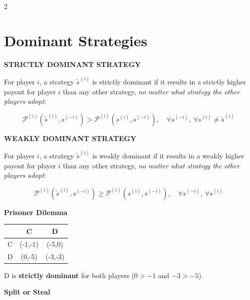 \documentclass[a4paper,9pt]{extarticle}
\begin{document}
\begin{multicols}{2}
\section{Dominant Strategies}


\begin{definition}

\textbf{STRICTLY DOMINANT STRATEGY}

For player $i$, a strategy $\tilde{s}^{(i)}$ is strictly dominant if it results in a
strictly higher payout for player $i$ than any other strategy, \emph{no matter what strategy
the other players adopt}:

\[
\mathcal{P}^{(i)}(\tilde{s}^{(i)}, s^{(-i)}) > \mathcal{P}^{(i)}(s^{(i)}, s^{(-i)}),
\quad \forall s^{(-i)}, \ \forall s^{(i)} \ne \tilde{s}^{(i)}
\]

\end{definition}


\begin{definition}

\textbf{WEAKLY DOMINANT STRATEGY}

For player $i$, a strategy $\tilde{s}^{(i)}$ is weakly dominant if it results in a weakly
higher payout for player $i$ than any other strategy, \emph{no matter what strategy the
other players adopt}:

\[
\mathcal{P}^{(i)}(\tilde{s}^{(i)}, s^{(-i)}) \ge \mathcal{P}^{(i)}(s^{(i)}, s^{(-i)}),
\quad \forall s^{(-i)}, \ \forall s^{(i)}
\]

\end{definition}


\begin{example}

\textbf{Prisoner Dilemma}

\begin{center}
\begin{tabular}{c|cc}
 & C & D \\
\hline
C & (-1,-1) & (-5,0) \\
D & (0,-5) & (-3,-3) \\
\end{tabular}
\end{center}

D is \textbf{strictly dominant} for both players ($0 > -1$ and $-3 > -5$).

\end{example}


\begin{example}

\textbf{Split or Steal}


\end{example}
\end{multicols}
\end{document}
